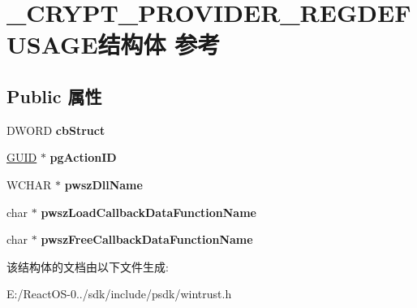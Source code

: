 \hypertarget{struct___c_r_y_p_t___p_r_o_v_i_d_e_r___r_e_g_d_e_f_u_s_a_g_e}{}\section{\+\_\+\+C\+R\+Y\+P\+T\+\_\+\+P\+R\+O\+V\+I\+D\+E\+R\+\_\+\+R\+E\+G\+D\+E\+F\+U\+S\+A\+G\+E结构体 参考}
\label{struct___c_r_y_p_t___p_r_o_v_i_d_e_r___r_e_g_d_e_f_u_s_a_g_e}
\subsection*{Public 属性}
\begin{DoxyCompactItemize}
\item 
\mbox{\label{struct___c_r_y_p_t___p_r_o_v_i_d_e_r___r_e_g_d_e_f_u_s_a_g_e_a135a471815a5314d374f4c56cabc3255}} 
D\+W\+O\+RD {\bfseries cb\+Struct}
\item 
\mbox{\label{struct___c_r_y_p_t___p_r_o_v_i_d_e_r___r_e_g_d_e_f_u_s_a_g_e_a1593d8fff68ef85f0e7e5197fbb92cef}} 
\hyperlink{interface_g_u_i_d}{G\+U\+ID} $\ast$ {\bfseries pg\+Action\+ID}
\item 
\mbox{\label{struct___c_r_y_p_t___p_r_o_v_i_d_e_r___r_e_g_d_e_f_u_s_a_g_e_aada257517444fe634a086da72574c4fe}} 
W\+C\+H\+AR $\ast$ {\bfseries pwsz\+Dll\+Name}
\item 
\mbox{\label{struct___c_r_y_p_t___p_r_o_v_i_d_e_r___r_e_g_d_e_f_u_s_a_g_e_a1ee0904ae668704df0e855227da66fed}} 
char $\ast$ {\bfseries pwsz\+Load\+Callback\+Data\+Function\+Name}
\item 
\mbox{\label{struct___c_r_y_p_t___p_r_o_v_i_d_e_r___r_e_g_d_e_f_u_s_a_g_e_a943419c27bbeecdac3e872f6873c1f4a}} 
char $\ast$ {\bfseries pwsz\+Free\+Callback\+Data\+Function\+Name}
\end{DoxyCompactItemize}


该结构体的文档由以下文件生成\+:\begin{DoxyCompactItemize}
\item 
E\+:/\+React\+O\+S-\/0../sdk/include/psdk/wintrust.\+h\end{DoxyCompactItemize}
